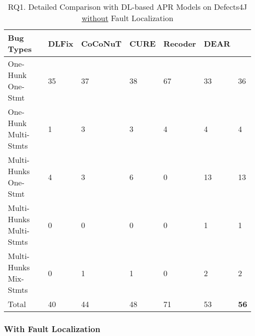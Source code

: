 \begin{table}
	\caption{RQ1. Detailed Comparison with DL-based APR Models on Defects4J \underline{without} Fault Localization}
	\vspace{-7pt}
	\begin{center}
	  \small
          \tabcolsep 2.5pt
		\renewcommand{\arraystretch}{1} 
\begin{tabular}{p{2.9cm}<{\centering}|p{0.7cm}<{\centering}|p{1.1cm}<{\centering}|p{0.6cm}<{\centering}|p{0.8cm}<{\centering}|p{0.7cm}<{\centering}|p{0.7cm}}
			\hline
			Bug Types & DLFix& CoCoNuT & CURE & Recoder & DEAR & {\tool}\\\hline
			
			One-Hunk One-Stmt  & 35 & 37 & 38 & 67 & 33 & 36\\
			One-Hunk Multi-Stmts  & 1 &3 & 3 & 4 & 4 & 4\\ 
			Multi-Hunks One-Stmt  & 4 &3 & 6 & 0 & 13 & 13 \\
			Multi-Hunks Multi-Stmts  & 0 &0 & 0 & 0 & 1 & 1\\
			Multi-Hunks Mix-Stmts  & 0 & 1 & 1 & 0 & 2 & 2\\\hline
			Total & 40 & 44 & 48 & 71 & 53 & {\bf 56}\\
			\hline
		\end{tabular}
		\label{multi:tab}
	\end{center}
	\vspace{-4pt} %
\end{table}



\subsubsection{{\bf With Fault Localization}}


